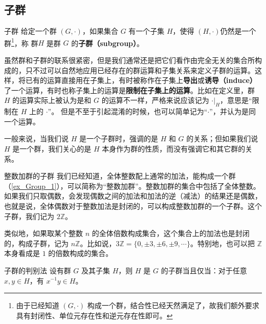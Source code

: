 

\subsection{子群}

\begin{definition}{子群}
给定一个群 $(G, \cdot)$，如果集合 $G$ 有一个子集 $H$，使得 $(H, \cdot)$仍然是一个群\footnote{由于已经知道 $(G,\cdot)$ 构成一个群，结合性已经天然满足了，故我们额外要求具有封闭性、单位元存在性和逆元存在性即可。}，称 群$H$ 是群 $G$ 的\textbf{子群（subgroup）}。
\end{definition}

虽然群和子群的联系很紧密，但是我们通常还是把它们看作由完全无关的集合所构成的，只不过可以自然地应用已经存在的群运算和子集关系来定义子群的运算。这样，将已有的运算直接用在子集上，有时被称作在子集上\textbf{导出}或\textbf{诱导（induce）}了一个运算，有时也称子集上的运算是\textbf{限制在子集上的运算}。比如在定义里，群 $H$ 的运算实际上被认为是和 $G$ 的运算不一样，严格来说应该记为 $\cdot|_H$，意思是“限制在 $H$ 上的 $\cdot$”。 但是不至于引起混淆的时候，也可以简单记为“$\cdot$”，并认为是同一个运算。

一般来说，当我们说 $H$ 是一个子群时，强调的是 $H$ 和 $G$ 的关系；但如果我们说 $H$ 是一个群，我们关心的是 $H$ 本身作为群的性质，而没有强调它和其它群的关系。

\begin{example}{整数加群的子群}\label{ex_Group1_1}
我们已经知道，全体整数配上通常的加法，能构成一个群（\autoref{ex_Group_1}），可以简称为“整数加群”。整数加群的集合中包括了全体整数。如果我们只取偶数，会发现偶数之间的加法和加法的逆（减法）的结果还是偶数，也就是说，全体偶数对于整数加法是封闭的，可以构成整数加群的一个子群。这个子群，我们记为 $2\mathbb{Z}$。

类似地，如果取某个整数 $n$ 的全体倍数构成集合，这个集合上的加法也是封闭的，构成子群，记为 $n\mathbb{Z}$。比如说，$3\mathbb{Z}=\{0, \pm3, \pm6, \pm9, \cdots\}$。特别地，也可以把 $\mathbb{Z}$ 本身看成是 $1$ 的倍数构成的集合。
\end{example}

\begin{theorem}{子群的判别法}\label{the_Group1_3}
设有群 $G$ 及其子集 $H$，则 $H$ 是 $G$ 的子群当且仅当：对于任意 $x, y\in H$，有 $x^{-1}y\in H$。
\end{theorem}

